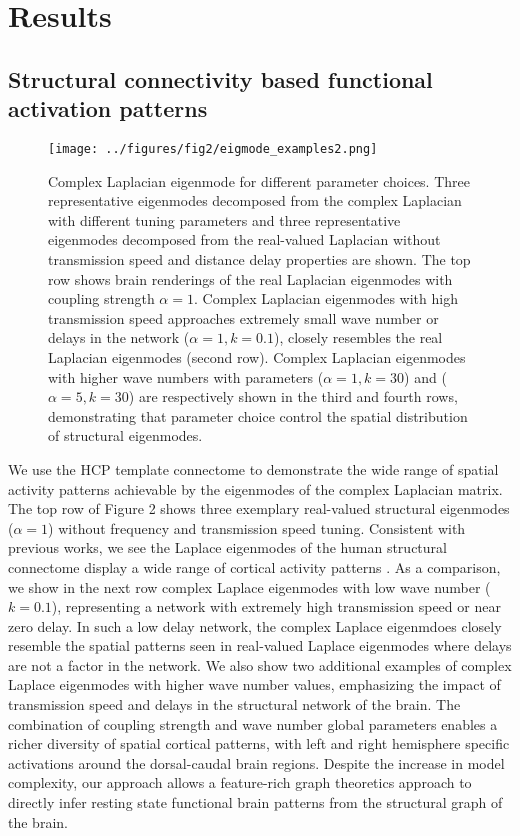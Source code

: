 \documentclass{article}
\begin{document}
\section{Results}

\subsection{Structural connectivity based functional activation patterns}

\begin{figure}[ht]
 \centering
 \texttt{[image: ../figures/fig2/eigmode\_examples2.png]}
 \caption{Complex Laplacian eigenmode for different parameter choices. Three representative eigenmodes decomposed from the complex Laplacian with different tuning parameters and three representative eigenmodes decomposed from the real-valued Laplacian without transmission speed and distance delay properties are shown. The top row shows brain renderings of the real Laplacian eigenmodes with coupling strength $\alpha = 1$. Complex Laplacian eigenmodes with high transmission speed approaches extremely small wave number or delays in the network ($\alpha = 1, k = 0.1$), closely resembles the real Laplacian eigenmodes (second row). Complex Laplacian eigenmodes with higher wave numbers with parameters ($\alpha = 1, k = 30$) and ($\alpha = 5, k = 30$) are respectively shown in the third and fourth rows, demonstrating that parameter choice control the spatial distribution of structural eigenmodes.}
 \label{fig:fig2}
\end{figure}

We use the HCP template connectome to demonstrate the wide range of spatial activity patterns achievable by the eigenmodes of the complex Laplacian matrix. The top row of Figure 2 shows three exemplary real-valued structural eigenmodes ($\alpha = 1$) without frequency and transmission speed tuning. Consistent with previous works, we see the Laplace eigenmodes of the human structural connectome display a wide range of cortical activity patterns \cite{Abdelnour2018, Atasoy2016}. As a comparison, we show in the next row complex Laplace eigenmodes with low wave number ($k=0.1$), representing a network with extremely high transmission speed or near zero delay. In such a low delay network, the complex Laplace eigenmdoes closely resemble the spatial patterns seen in real-valued Laplace eigenmodes where delays are not a factor in the network. We also show two additional examples of complex Laplace eigenmodes with higher wave number values, emphasizing the impact of transmission speed and delays in the structural network of the brain. The combination of coupling strength and wave number global parameters enables a richer diversity of spatial cortical patterns, with left and right hemisphere specific activations around the dorsal-caudal brain regions. Despite the increase in model complexity, our approach allows a feature-rich graph theoretics approach to directly infer resting state functional brain patterns from the structural graph of the brain. 
\end{document}
